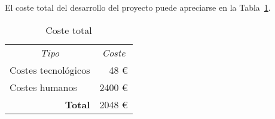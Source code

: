 El coste total del desarrollo del proyecto puede apreciarse en la Tabla~\ref{tab:coste-total}.

\begin{table}[ht]
\centering
\caption{Coste total}
\label{tab:coste-total}
\begin{tabular}{lr}
\hline
\multicolumn{1}{c}{\multirow{2}{*}{\textit{Tipo}}} & \multicolumn{1}{c}{\multirow{2}{*}{\textit{Coste}}} \\
\multicolumn{1}{c}{}                               & \multicolumn{1}{c}{}                                \\ \hline
Costes tecnológicos                                & 48 €                                                \\ \hline
Costes humanos                                     & 2400 €                                              \\ \hline
\multicolumn{1}{r}{\textbf{Total}}                 & 2048 €                                              \\ \hline
\end{tabular}
\end{table}